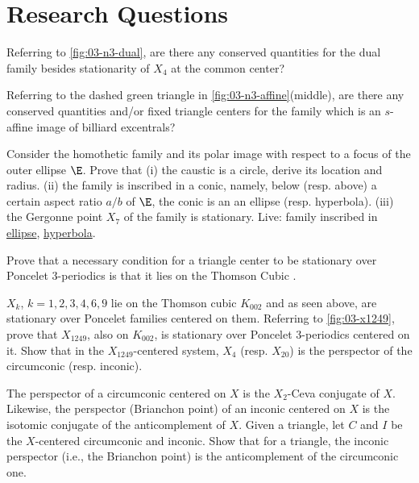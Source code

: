 \section{Research Questions}

\begin{question}
Referring to \cref{fig:03-n3-dual}, are there any conserved quantities for the dual family besides stationarity of $X_4$ at the common center?
\end{question}

\begin{question}
Referring to  the dashed green triangle in \cref{fig:03-n3-affine}(middle), are there any conserved quantities and/or fixed triangle centers for the family which is an $s$-affine image of billiard excentrals?
\end{question}

\begin{question}
Consider the homothetic family and its polar image with respect to a focus of the outer ellipse $\E$. Prove that (i) the caustic is a circle, derive its location and radius. (ii) the family is inscribed in a conic, namely, below (resp. above) a certain aspect ratio $a/b$ of $\E$, the conic is an an ellipse (resp. hyperbola). (iii) the Gergonne point $X_7$ of the family is stationary.
Live: family inscribed in \href{https://bit.ly/33p7xj6}{ellipse}, \href{https://bit.ly/3bbTaTt}{hyperbola}.
\end{question}

\begin{question}
Prove that a necessary condition for a triangle center to be stationary over Poncelet 3-periodics is that it lies on the Thomson Cubic \cite{gibert2021-thomson}. 
\end{question}

\begin{question}
$X_k$, $k=1,2,3,4,6,9$ lie on the Thomson cubic $K_{002}$ and as seen above, are stationary over Poncelet families centered on them. Referring to \cref{fig:03-x1249}, prove that $X_{1249}$, also on $K_{002}$, is stationary over Poncelet 3-periodics centered on it. Show that in the $X_{1249}$-centered system, $X_4$ (resp. $X_{20}$) is the perspector of the circumconic (resp. inconic). 
\label{que:03-x1249}
\end{question}

\begin{question}
The perspector of a circumconic centered on $X$ is the $X_2$-Ceva conjugate of $X$. Likewise, the perspector (Brianchon point) of an inconic centered on $X$ is the isotomic conjugate of the anticomplement of $X$. Given a triangle, let $C$ and $I$ be the $X$-centered circumconic and inconic. Show that for a triangle, the inconic perspector (i.e., the Brianchon point) is the anticomplement of the circumconic one.
\end{question}

